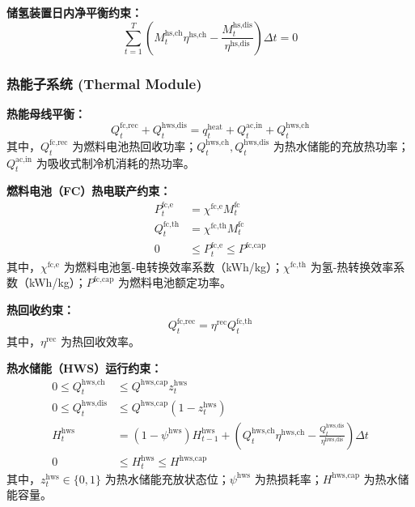 \documentclass[11pt]{ctexart}
\begin{document}
\textbf{储氢装置日内净平衡约束：}
\begin{equation}
\sum_{t=1}^{T} \left( M_{t}^{\text{hs,ch}} \eta^{\text{hs,ch}} - \frac{M_{t}^{\text{hs,dis}}}{\eta^{\text{hs,dis}}} \right) \Delta t = 0
\end{equation}

\subsubsection{热能子系统 (Thermal Module)}

\textbf{热能母线平衡：}
\begin{equation}
Q_{t}^{\text{fc,rec}} + Q_{t}^{\text{hws,dis}} = q_{t}^{\text{heat}} + Q_{t}^{\text{ac,in}} + Q_{t}^{\text{hws,ch}}
\end{equation}
其中，$Q_{t}^{\text{fc,rec}}$ 为燃料电池热回收功率；$Q_{t}^{\text{hws,ch}}, Q_{t}^{\text{hws,dis}}$ 为热水储能的充放热功率；$Q_{t}^{\text{ac,in}}$ 为吸收式制冷机消耗的热功率。

\textbf{燃料电池（FC）热电联产约束：}
\begin{align}
P_{t}^{\text{fc,e}} & = \chi^{\text{fc,e}} M_{t}^{\text{fc}} \\
Q_{t}^{\text{fc,th}} & = \chi^{\text{fc,th}} M_{t}^{\text{fc}} \\
0 & \le P_{t}^{\text{fc,e}} \le P^{\text{fc,cap}}
\end{align}
其中，$\chi^{\text{fc,e}}$ 为燃料电池氢-电转换效率系数（kWh/kg）；$\chi^{\text{fc,th}}$ 为氢-热转换效率系数（kWh/kg）；$P^{\text{fc,cap}}$ 为燃料电池额定功率。

\textbf{热回收约束：}
\begin{equation}
Q_{t}^{\text{fc,rec}} = \eta^{\text{rec}} Q_{t}^{\text{fc,th}}
\end{equation}
其中，$\eta^{\text{rec}}$ 为热回收效率。

\textbf{热水储能（HWS）运行约束：}
\begin{align}
0 \le Q_{t}^{\text{hws,ch}} & \le Q^{\text{hws,cap}} z_{t}^{\text{hws}} \\
0 \le Q_{t}^{\text{hws,dis}} & \le Q^{\text{hws,cap}} (1 - z_{t}^{\text{hws}}) \\
H_{t}^{\text{hws}} & = (1 - \psi^{\text{hws}}) H_{t-1}^{\text{hws}} + \left( Q_{t}^{\text{hws,ch}} \eta^{\text{hws,ch}} - \frac{Q_{t}^{\text{hws,dis}}}{\eta^{\text{hws,dis}}} \right) \Delta t \\
0 & \le H_{t}^{\text{hws}} \le H^{\text{hws,cap}}
\end{align}
其中，$z_{t}^{\text{hws}} \in \{0, 1\}$ 为热水储能充放状态位；$\psi^{\text{hws}}$ 为热损耗率；$H^{\text{hws,cap}}$ 为热水储能容量。
\end{document}
